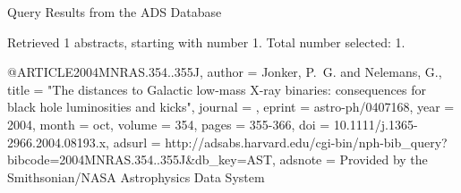 Query Results from the ADS Database


Retrieved 1 abstracts, starting with number 1.  Total number selected: 1.

@ARTICLE{2004MNRAS.354..355J,
   author = {{Jonker}, P.~G. and {Nelemans}, G.},
    title = "{The distances to Galactic low-mass X-ray binaries: consequences for black hole luminosities and kicks}",
  journal = {\mnras},
   eprint = {astro-ph/0407168},
     year = 2004,
    month = oct,
   volume = 354,
    pages = {355-366},
      doi = {10.1111/j.1365-2966.2004.08193.x},
   adsurl = {http://adsabs.harvard.edu/cgi-bin/nph-bib_query?bibcode=2004MNRAS.354..355J&db_key=AST},
  adsnote = {Provided by the Smithsonian/NASA Astrophysics Data System}
}


